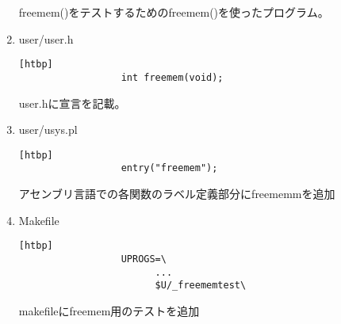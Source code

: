 \documentclass[a4j,12pt]{jreport}
\begin{document}
\begin{enumerate}
            freemem()をテストするためのfreemem()を使ったプログラム。

      \item user/user.h
            \begin{lstlisting}[basicstyle=\ttfamily\footnotesize, firstnumber=0][htbp]
                  int freemem(void);
            \end{lstlisting}

            user.hに宣言を記載。

      \item user/usys.pl
            \begin{lstlisting}[basicstyle=\ttfamily\footnotesize, firstnumber=0][htbp]
                  entry("freemem");
            \end{lstlisting}

            アセンブリ言語での各関数のラベル定義部分にfreememmを追加

      \item Makefile
            \begin{lstlisting}[basicstyle=\ttfamily\footnotesize, firstnumber=0][htbp]
                  UPROGS=\
                        ...
                        $U/_freememtest\
            \end{lstlisting}

            makefileにfreemem用のテストを追加

\end{enumerate}
\end{document}
